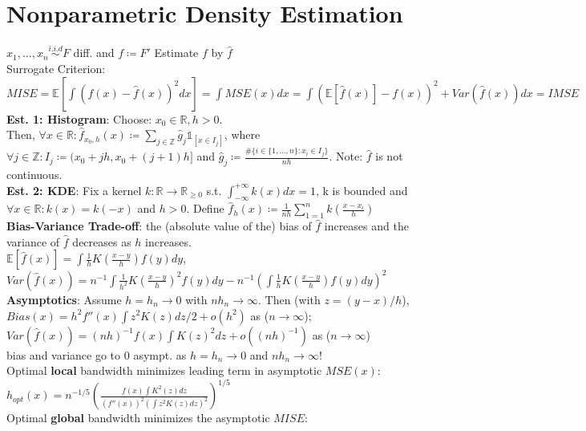 \section{Nonparametric Density Estimation}
$x_1,...,x_n \overset{i.i.d}{\sim} F$ diff. and $f \coloneqq F'$ \textrightarrow Estimate $f$ by $\hat{f}$\\
Surrogate Criterion: $MISE=\mathbb{E}[\int{(f(x)-\hat{f}(x))^2}dx]=\int{MSE(x)}dx=\int{(\mathbb{E}[\hat{f}(x)]-f(x))^2+Var(\hat{f}(x))}dx=IMSE$\\
\textbf{Est. 1: Histogram}: Choose: $x_0 \in \mathbb{R}, h>0$. \\ 
Then, $\forall x\in \mathbb{R}: \hat{f}_{x_0, h}(x) \coloneqq \sum_{j\in \mathbb{Z}}\hat{g}_j\mathds{1}_{[x\in I_j]}$, where $\forall j \in \mathbb{Z}: I_j \coloneqq (x_0+jh, x_0+(j+1)h]$ and $\hat{g}_j \coloneqq \frac{\#\{i\in \{1,...,n\}: x_i\in I_j\}}{nh}$. Note: $\hat{f}$ is not continuous. \\
\textbf{Est. 2: KDE}: Fix a kernel $k: \mathbb{R} \to \mathbb{R}_{\geq 0}$ s.t. $\int_{-\infty}^{+\infty}{k(x)}dx=1$, k is bounded and $\forall x\in \mathbb{R}: k(x)=k(-x)$ and $h>0$. Define $\hat{f}_{h}(x) \coloneqq \frac{1}{nh}\sum_{1=1}^{n}k\left(\frac{x-x_i}{h}\right)$ \\
\textbf{Bias-Variance Trade-off}: the (absolute value of the) bias of $\hat{f}$ increases and the variance of $\hat{f}$ decreases as $h$ increases.\\
$\mathbb{E}[\hat{f}(x)] = \int{\frac{1}{h}K\left(\frac{x-y}{h}\right)f(y)dy}$,  \\ 
$Var(\hat{f}(x))=n^{-1}\int{\frac{1}{h^2}K\left(\frac{x-y}{h}\right)^2 f(y)dy} - n^{-1}\left(\int{\frac{1}{h}K\left(\frac{x-y}{h}\right)f(y)dy}\right)^2$ \\
\textbf{Asymptotics}: Assume $h=h_n \to 0$ with $nh_n \to \infty$. Then (with $z=(y-x)/h$), \\
$Bias(x)=h^2f''(x)\int{z^2K(z)dz/2}+o(h^2)$ as ($n\to\infty$); \\
$Var(\hat{f}(x))=(nh)^{-1}f(x)\int{K(z)^2dz} + o((nh)^{-1})$ as  ($n\to\infty$) \\
\textrightarrow bias and variance go to 0 asympt. as $h=h_n \to 0$ and $nh_n \to \infty$! \\
Optimal \textbf{local} bandwidth minimizes leading term in asymptotic $MSE(x)$:\\
$h_{opt}(x)=n^{-1/5}\left(\frac{f(x)\int{K^2(z)dz}}{(f''(x))^2(\int{z^2K(z)dz})^2}\right)^{1/5}$\\
Optimal \textbf{global} bandwidth minimizes the asymptotic $MISE$:\\
